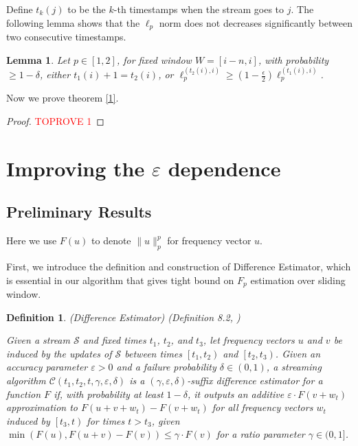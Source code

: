 \documentclass{article}
\newcommand{\diff}{\textsf{Difference Estimator}}
\newcommand{\eps}{\varepsilon}
\theoremstyle{plain}
\newtheorem{lem}[theorem]{Lemma}
\newtheorem{defn}[theorem]{Definition}
\begin{document}
Define $t_k(j)$ to be the $k$-th timestamps when the stream goes to $j$. The following lemma shows that the $\ell_p$ norm does not decreases significantly between two consecutive timestamps.
\begin{lem}\label{Eps Approx}
    Let $p \in [1, 2]$, for fixed window $W = [i - n, i]$, with probability $\ge 1 - \delta$, either $t_1(i) + 1 = t_2(i)$, or $\ell_p ^ {(t_2(i), i)} \ge (1 - \frac {\epsilon}2) \ell_p ^ {(t_1(i), i)}$. 
\end{lem}























Now we prove theorem \ref{1}. 
\begin{proof}\textcolor{red}{TOPROVE 1}\end{proof}


 
\section{Improving the $\eps$ dependence}
\subsection{Preliminary Results} 

Here we use $F(u)$ to denote $\|u\|_p ^ p$ for frequency vector $u$. 

First, we introduce the definition and construction of \diff, which is essential in our algorithm that gives tight bound on $F_p$ estimation over sliding window. 

\begin{defn}\label{dif} (Difference Estimator) (Definition 8.2, \cite{woodruff2022tight})

Given a stream $\mathcal{S}$ and fixed times $t_1$, $t_2$, and $t_3$, let frequency vectors $u$ and $v$ be induced by the updates of $\mathcal{S}$ between times $\left[t_1, t_2\right)$ and $\left[t_2, t_3\right)$. Given an accuracy parameter $\varepsilon>0$ and a failure probability $\delta \in(0,1)$, a streaming algorithm $\mathcal{C}\left(t_1, t_2, t, \gamma, \varepsilon, \delta\right)$ is a $(\gamma, \varepsilon, \delta)$-suffix difference estimator for a function $F$ if, with probability at least $1-\delta$, it outputs an additive $\varepsilon \cdot F\left(v+w_t\right)$ approximation to $F\left(u+v+w_t\right)-F\left(v+w_t\right)$ for all frequency vectors $w_t$ induced by $\left[t_3, t\right)$ for times $t>t_3$, given $\min (F(u), F(u+v)-F(v)) \leq \gamma \cdot F(v)$ for a ratio parameter $\gamma \in(0,1]$.
    
\end{defn}
\end{document}
